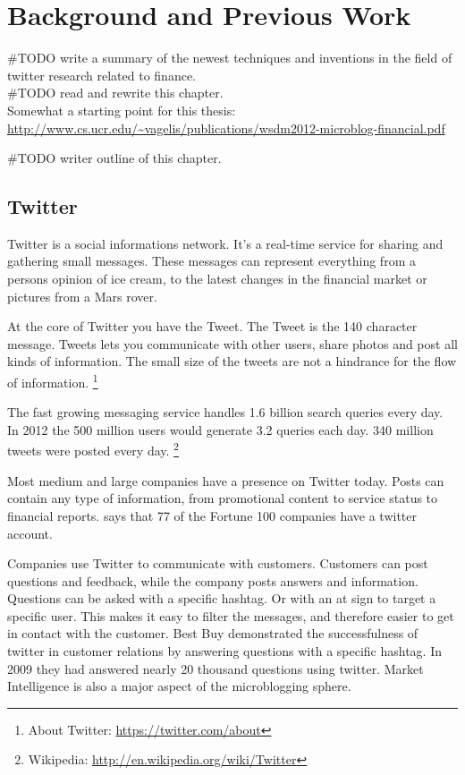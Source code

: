 \chapter{Background and Previous Work}\label{previous_work}
#TODO write a summary of the newest techniques and inventions in the field of
twitter research related to finance.\\ 
#TODO read and rewrite this chapter. \\

Somewhat a starting point for this thesis:
\url{http://www.cs.ucr.edu/~vagelis/publications/wsdm2012-microblog-financial.pdf}

#TODO writer outline of this chapter. 

\section{Twitter}
Twitter is a social informations network. 
It's a real-time service for sharing and gathering small messages. These
messages can represent everything from a persons opinion of ice cream, to the
latest changes in the financial market or pictures from a Mars rover. 

At the core of Twitter you have the Tweet. The Tweet is the 140 character
message. 
Tweets lets you communicate with other users, share photos and post all kinds of
information. The small size of the tweets are not a hindrance for the flow of
information. 
\footnote{About Twitter: \url{https://twitter.com/about}}

The fast growing messaging service handles 1.6 billion search queries every day.
In 2012 the 500 million users would generate 3.2 queries each day. 340 million tweets were posted every day. 
\footnote{Wikipedia: \url{http://en.wikipedia.org/wiki/Twitter}} 

Most medium and large companies have a presence on Twitter today. Posts can contain
any type of information, from promotional content to service status to
financial reports. \cite[p8]{annikajubbega11:twitter_driver_stock_price} says
that 77 of the Fortune 100 companies have a twitter account. 

Companies use Twitter to communicate with customers. Customers can post
questions and feedback, while the company posts answers and information.
Questions can be asked with a specific hashtag. Or with an at sign to target a
specific user. This makes it easy to filter the messages, and therefore easier
to get in contact with the customer. Best Buy demonstrated the successfulness of
twitter in customer relations by answering questions with a specific hashtag. In
2009 they had answered nearly 20 thousand questions using twitter.
\cite[p1]{Li2013206} Market Intelligence is also a major aspect of the
microblogging sphere.

